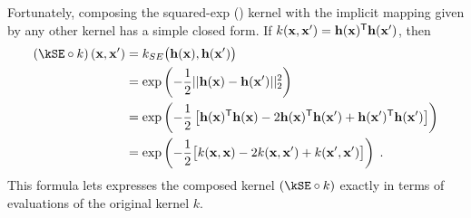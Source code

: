 Fortunately, composing the squared-exp (\kSE{}) kernel with the implicit mapping given by any other kernel has a simple closed form.
If $k({\bf{x}}, {\bf{x}}') = {\bf{h}}({\bf{x}})^{\mathsf{T}} {\bf{h}}({\bf{x}}')$, then
%
\begin{align}
\left( \kSE \circ k \right) \left( \vx, \vx' \right) & = k_{SE} \big( \hPhi(\vx), \hPhi(\vx') \big) \\
& = \exp \left( -\frac{1}{2} || \hPhi(\vx) - \hPhi(\vx')||_2^2 \right) \\
& = \exp\left ( -\frac{1}{2} \left[ \hPhi(\vx) \tra \hPhi(\vx) - 2 \hPhi(\vx) \tra \hPhi(\vx') + \hPhi(\vx') \tra \hPhi(\vx') \right] \right)  \\
& = \exp \left( -\frac{1}{2} \big[ k(\vx, \vx) - 2 k(\vx, \vx') + k(\vx', \vx') \big] \right) \; .
\end{align}
%
%
%
This formula lets expresses the composed kernel $(\kSE \circ k)$ exactly in terms of evaluations of the original kernel $k$.


